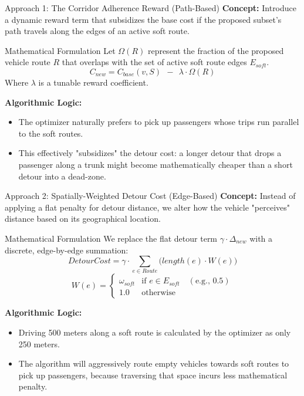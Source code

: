 \documentclass[aspectratio=169]{beamer}
\begin{document}
\begin{frame}{Approach 1: The Corridor Adherence Reward (Path-Based)}
  \textbf{Concept:} Introduce a dynamic reward term that subsidizes the base cost if the proposed subset's path travels along the edges of an active soft route.
  
  \vspace{0.3cm}
  \begin{block}{Mathematical Formulation}
  Let $\Omega(R)$ represent the fraction of the proposed vehicle route $R$ that overlaps with the set of active soft route edges $E_{soft}$.
  \[ C_{new} = C_{base}(v, S) \textbf{ } \mathbf{-} \textbf{ } \lambda \cdot \Omega(R) \]
  Where $\lambda$ is a tunable reward coefficient.
  \end{block}
  
  \vspace{0.3cm}
  \textbf{Algorithmic Logic:}
  \begin{itemize}
      \item The optimizer naturally prefers to pick up passengers whose trips run parallel to the soft routes.
      \item This effectively "subsidizes" the detour cost: a longer detour that drops a passenger along a trunk might become mathematically cheaper than a short detour into a dead-zone.
  \end{itemize}
\end{frame}

\begin{frame}{Approach 2: Spatially-Weighted Detour Cost (Edge-Based)}
  \textbf{Concept:} Instead of applying a flat penalty for detour distance, we alter how the vehicle "perceives" distance based on its geographical location.
  
  \vspace{0.3cm}
  \begin{block}{Mathematical Formulation}
  We replace the flat detour term $\gamma \cdot \Delta_{new}$ with a discrete, edge-by-edge summation:
  \[ DetourCost = \gamma \cdot \sum_{e \in Route} \Big( length(e) \cdot W(e) \Big) \]
  \[ 
    W(e) = 
    \begin{cases} 
      \omega_{soft} & \text{if } e \in E_{soft} \quad (\text{e.g., } 0.5) \\
      1.0 & \text{otherwise} 
    \end{cases}
  \]
  \end{block}
  
  \vspace{0.2cm}
  \textbf{Algorithmic Logic:}
  \begin{itemize}
      \item Driving 500 meters along a soft route is calculated by the optimizer as only 250 meters.
      \item The algorithm will aggressively route empty vehicles towards soft routes to pick up passengers, because traversing that space incurs less mathematical penalty.
  \end{itemize}
\end{frame}
\end{document}
